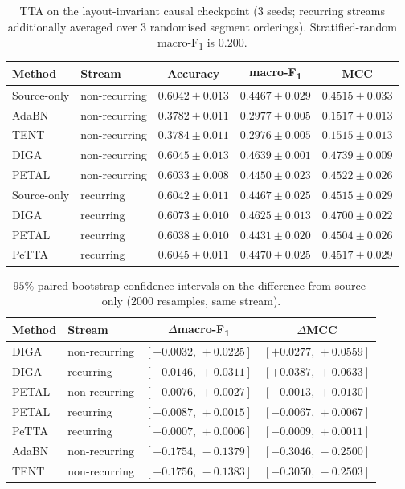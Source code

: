 \documentclass[a4paper,fleqn]{cas-dc}
\newcommand{\macf}{macro-F\textsubscript{1}}
\begin{document}
\begin{table}[t]
\centering
\caption{TTA on the layout-invariant causal checkpoint (3 seeds; recurring streams
additionally averaged over 3 randomised segment orderings). Stratified-random \macf{} is
$0.200$.}
\label{tab:tta}
\small
\begin{tabular}{llccc}
\toprule
Method & Stream & Accuracy & \macf & MCC \\
\midrule
Source-only & non-recurring & $0.6042\pm0.013$ & $0.4467\pm0.029$ & $0.4515\pm0.033$ \\
AdaBN       & non-recurring & $0.3782\pm0.011$ & $0.2977\pm0.005$ & $0.1517\pm0.013$ \\
TENT        & non-recurring & $0.3784\pm0.011$ & $0.2976\pm0.005$ & $0.1515\pm0.013$ \\
DIGA        & non-recurring & $0.6045\pm0.013$ & $\mathbf{0.4639}\pm0.001$ & $\mathbf{0.4739}\pm0.009$ \\
PETAL       & non-recurring & $0.6033\pm0.008$ & $0.4450\pm0.023$ & $0.4522\pm0.026$ \\
\midrule
Source-only & recurring & $0.6042\pm0.011$ & $0.4467\pm0.025$ & $0.4515\pm0.029$ \\
DIGA        & recurring & $\mathbf{0.6073}\pm0.010$ & $0.4625\pm0.013$ & $0.4700\pm0.022$ \\
PETAL       & recurring & $0.6038\pm0.010$ & $0.4431\pm0.020$ & $0.4504\pm0.026$ \\
PeTTA       & recurring & $0.6045\pm0.011$ & $0.4470\pm0.025$ & $0.4517\pm0.029$ \\
\bottomrule
\end{tabular}
\end{table}

\begin{table}[t]
\centering
\caption{$95\%$ paired bootstrap confidence intervals on the difference from source-only
($2000$ resamples, same stream).}
\label{tab:boot}
\small
\begin{tabular}{llcc}
\toprule
Method & Stream & $\Delta$\macf & $\Delta$MCC \\
\midrule
DIGA  & non-recurring & $[+0.0032,\,+0.0225]$ & $[+0.0277,\,+0.0559]$ \\
DIGA  & recurring     & $[+0.0146,\,+0.0311]$ & $[+0.0387,\,+0.0633]$ \\
PETAL & non-recurring & $[-0.0076,\,+0.0027]$ & $[-0.0013,\,+0.0130]$ \\
PETAL & recurring     & $[-0.0087,\,+0.0015]$ & $[-0.0067,\,+0.0067]$ \\
PeTTA & recurring     & $[-0.0007,\,+0.0006]$ & $[-0.0009,\,+0.0011]$ \\
AdaBN & non-recurring & $[-0.1754,\,-0.1379]$ & $[-0.3046,\,-0.2500]$ \\
TENT  & non-recurring & $[-0.1756,\,-0.1383]$ & $[-0.3050,\,-0.2503]$ \\
\bottomrule
\end{tabular}
\end{table}
\end{document}
